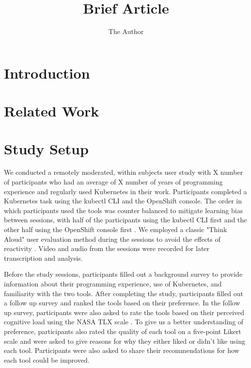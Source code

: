 \documentclass[11pt, oneside]{article}   	%
\title{Brief Article}
\author{The Author}
\begin{document}
\maketitle

\section{Introduction}

\section{Related Work}

\section{Study Setup}
We conducted a remotely moderated, within subjects user study with X number of participants who had an average of X number of years of programming experience and regularly used Kubernetes in their work. Participants completed a Kubernetes task using the kubectl CLI and the OpenShift console. The order in which participants used the tools was counter balanced to mitigate learning bias between sessions, with half of the participants using the kubectl CLI first and the other half using the OpenShift console first \cite{}. We employed a classic "Think Aloud" user evaluation method during the sessions to avoid the effects of reactivity \cite{}. Video and audio from the sessions were recorded for later transcription and analysis.

Before the study sessions, participants filled out a background survey to provide information about their programming experience, use of Kubernetes, and familiarity with the two tools. After completing the study, participants filled out a follow up survey and ranked the tools based on their preference. In the follow up survey, participants were also asked to rate the tools based on their perceived cognitive load using the NASA TLX scale \cite{}. To give us a better understanding of preference, participants also rated the quality of each tool on a five-point Likert scale and were asked to give reasons for why they either liked or didn’t like using each tool. Participants were also asked to share their recommendations for how each tool could be improved.
\end{document}
